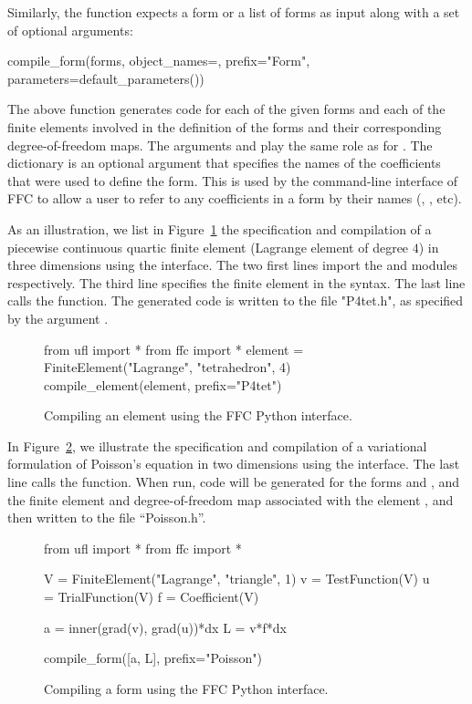 Similarly, the  function expects a form or a list
of forms as input along with a set of optional arguments:
%
\begin{python}
compile_form(forms,
             object_names={},
             prefix="Form",
             parameters=default_parameters())
\end{python}
%
The above function generates code for each of the given forms and each of
the finite elements involved in the definition of the forms and their
corresponding degree-of-freedom maps. The arguments  and
 play the same role as for
. The  dictionary is an optional
argument that specifies the names of the coefficients that were used
to define the form. This is used by the command-line interface of FFC
to allow a user to refer to any coefficients in a form by their names
(, , etc).

As an illustration, we list in Figure~\ref{fig:python:element} the
specification and compilation of a piecewise continuous quartic finite
element (Lagrange element of degree $4$) in three dimensions using the
\ffc{} \pythonlang{} interface. The two first lines import the \ufl{}
and \ffc{} modules respectively. The third line specifies the finite
element in the \ufl{} syntax. The last line calls the \ffc{}
 function. The generated code is written to
the file "P4tet.h", as specified by the argument .

\begin{figure}
  \begin{python}
from ufl import *
from ffc import *
element = FiniteElement("Lagrange", "tetrahedron", 4)
compile_element(element, prefix="P4tet")
  \end{python}
  \caption{Compiling an element using the FFC Python interface.}
  \label{fig:python:element}
\end{figure}

In Figure~\ref{fig:python:form}, we illustrate the specification
and compilation of a variational formulation of Poisson's equation in
two dimensions using the \pythonlang{} interface. The last line
calls the  function. When run, code will be
generated for the forms  and , and the finite
element and degree-of-freedom map associated with the element
, and then written to the file ``Poisson.h''.

\begin{figure}
  \begin{python}
from ufl import *
from ffc import *

V = FiniteElement("Lagrange", "triangle", 1)
v = TestFunction(V)
u = TrialFunction(V)
f = Coefficient(V)

a = inner(grad(v), grad(u))*dx
L = v*f*dx

compile_form([a, L], prefix="Poisson")
  \end{python}
  \caption{Compiling a form using the FFC Python interface.}
  \label{fig:python:form}
\end{figure}

